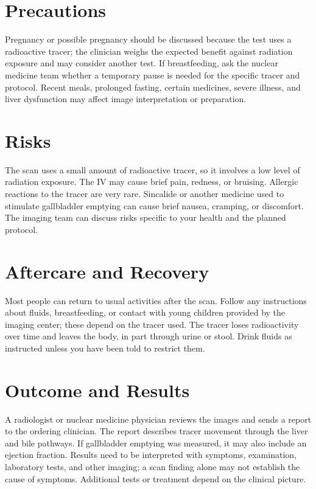\section*{Precautions}
Pregnancy or possible pregnancy should be discussed because the test uses a radioactive tracer; the clinician weighs the expected benefit against radiation exposure and may consider another test. If breastfeeding, ask the nuclear medicine team whether a temporary pause is needed for the specific tracer and protocol. Recent meals, prolonged fasting, certain medicines, severe illness, and liver dysfunction may affect image interpretation or preparation.

\section*{Risks}
The scan uses a small amount of radioactive tracer, so it involves a low level of radiation exposure. The IV may cause brief pain, redness, or bruising. Allergic reactions to the tracer are very rare. Sincalide or another medicine used to stimulate gallbladder emptying can cause brief nausea, cramping, or discomfort. The imaging team can discuss risks specific to your health and the planned protocol.

\section*{Aftercare and Recovery}
Most people can return to usual activities after the scan. Follow any instructions about fluids, breastfeeding, or contact with young children provided by the imaging center; these depend on the tracer used. The tracer loses radioactivity over time and leaves the body, in part through urine or stool. Drink fluids as instructed unless you have been told to restrict them.

\section*{Outcome and Results}
A radiologist or nuclear medicine physician reviews the images and sends a report to the ordering clinician. The report describes tracer movement through the liver and bile pathways. If gallbladder emptying was measured, it may also include an ejection fraction. Results need to be interpreted with symptoms, examination, laboratory tests, and other imaging; a scan finding alone may not establish the cause of symptoms. Additional tests or treatment depend on the clinical picture.

